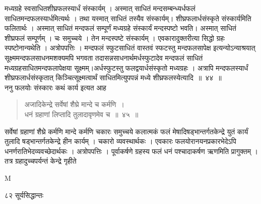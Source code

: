 \documentclass[11pt, openany]{book}
\begin{document}
\begin{sloppypar}
मध्यग्रहे स्वसाधितशीघ्रफलस्यार्धं संस्कार्यम् । अस्मात् साधितं मन्दसम्बन्ध्यर्धफलं साधितमन्दफलस्यार्धमित्यर्थः । तथा यस्मात् साधितं तस्यैव संस्कार्यम्। शीघ्रफलार्धसंस्कृते संस्कार्यमिति फलितार्थः । अस्मात् साधितं मन्दफलं सम्पूर्णं मध्यग्रहे संस्कार्यं मन्दस्पष्टो भवति। अस्मात् साधितं शीघ्रफलं सम्पूर्णम् । चः समुच्चये । तेन मन्दस्पष्टे संस्कार्यम् । एवकारादुक्तरीत्या सिद्धो ग्रहः स्पष्टोनान्यथेति । अत्रोपपत्तिः । मन्दफलं स्फुटसाधितं वास्तवं स्फटस्तु मन्दफलसापेक्ष इत्यन्योऽन्याश्रयात् सूक्ष्ममन्दफलसाधनमशक्यमपि भगवता तदासन्नसाधनार्थमर्धस्फुटादेव मन्दफलं साधितं मध्यग्रहसाधितमन्दफलापेक्षया सूक्ष्मम्।अर्धस्फुटस्तु फलद्वयार्धसंस्कृतो मध्यग्रहः । अत्रापि मन्दफलस्यार्धं शीघ्रफलार्धसंस्कृतात् किञ्चित्सूक्ष्मत्वार्थं साधितमित्युपपन्नं मध्ये शीघ्रफलस्येत्यादि~॥~४४~॥\\
\noindent ननु फलयोः संस्कारः कथं कार्य इत्यत आह\textendash
\end{sloppypar}
\begin{quote}

{\ssi अजादिकेन्द्रे सर्वेषां शैघ्रे मान्दे च कर्मणि~।\\
धनं ग्रहाणां लिप्तादि तुलादावृणमेव च~॥~४५~॥}
\end{quote}
\begin{sloppypar}
सर्वेषां ग्रहाणां शैघ्रे कर्मणि मान्दे कर्मणि चकारः समुच्चये कलात्मकं फलं मेषादिषड्भान्तर्गतकेन्द्रे युतं कार्यं तुलादि षड्भान्तर्गतकेन्द्रे हीन कार्यम् । चकारो व्यवस्थार्थकः । एवकारः फलयोरानयनप्रकारभेदेऽपि धनर्णरातिभेदव्यवच्छेदार्थकः । अत्रोपपत्तिः । पूर्वाकर्षणे ग्रहस्य फलं धनं पश्चादाकर्षण ऋणमिति प्रागुक्तम् । तत्र ग्रहादुच्चपर्यन्तं केन्द्रे गृहीते
\end{sloppypar}

{\tiny{M}}

\newpage

\noindent ८२ \hspace{4cm} सूर्यसिद्धान्तः
\vspace{1cm}
\end{document}
